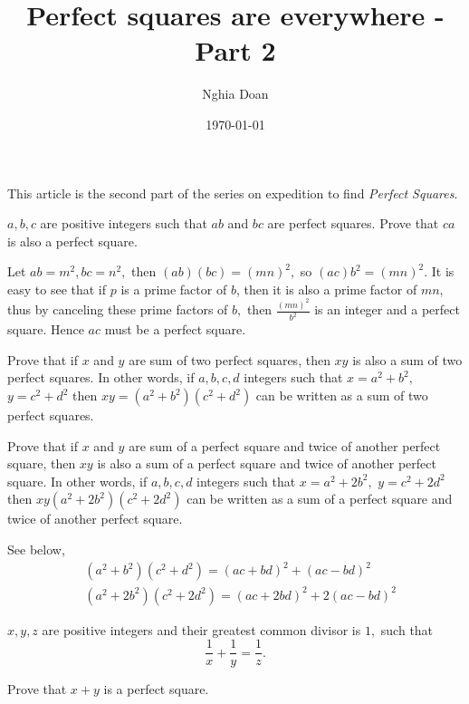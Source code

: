 \documentclass{article}
\title{Perfect squares are everywhere - Part 2}
\author{Nghia Doan}
\date{\today}
\begin{document}
\maketitle

This article is the second part of the series on expedition to find \textit{Perfect Squares}.

\begin{example*}[Example 6]
    $a, b, c$ are positive integers such that $ab$ and $bc$ are perfect squares.
    Prove that $ca$ is also a perfect square.
\end{example*}

\begin{soln}
    Let $ab=m^2, bc=n^2,$ then $(ab)(bc) = (mn)^2,$ so $(ac)b^2=(mn)^2.$
    It is easy to see that if $p$ is a prime factor of $b$, then it is also a prime factor of $mn,$
    thus by canceling these prime factors of $b,$ then $\frac{(mn)^2}{b^2}$ is an integer and a perfect square.
    Hence $ac$ must be a perfect square.
\end{soln}

\begin{example*}[Example 7]
    Prove that if $x$ and $y$ are sum of two perfect squares, then $xy$ is also a sum of two perfect squares.
    In other words, if $a,b,c,d$ integers such that $x=a^2+b^2,$ $y=c^2+d^2$ then $xy=(a^2+b^2)(c^2+d^2)$ 
    can be written as a sum of two perfect squares.
    
    Prove that if $x$ and $y$ are sum of a perfect square and twice of another perfect square,
    then $xy$ is also a sum of a perfect square and twice of another perfect square.
    In other words, if $a,b,c,d$ integers such that $x=a^2+2b^2,$ $y=c^2+2d^2$ then $xy(a^2+2b^2)(c^2+2d^2)$ 
    can be written as a sum of a perfect square and twice of another perfect square.
\end{example*}

\begin{soln}
    See below,
    \[
        \begin{aligned}
            &(a^2+b^2)(c^2+d^2) = (ac+bd)^2 + (ac-bd)^2\\
            &(a^2+2b^2)(c^2+2d^2) = (ac+2bd)^2 + 2(ac-bd)^2
        \end{aligned}
    \]
\end{soln}

\newpage

\begin{example*}[Example 8]
    $x, y, z$ are positive integers and their greatest common divisor is $1,$ such that
    \[
        \frac{1}{x} + \frac{1}{y} = \frac{1}{z}.
    \]

    Prove that $x+y$ is a perfect square.
\end{example*}
\end{document}
